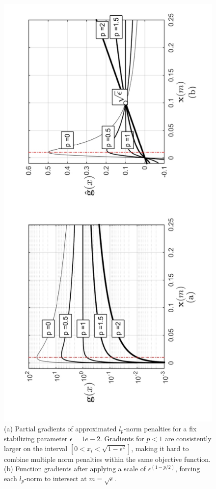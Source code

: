 \begin{figure}[h!]
\includegraphics[scale=0.58,angle=270]{Lp_g_scaled}
\caption{(a) Partial gradients of approximated $l_p$-norm penalties for a fix stabilizing parameter $\epsilon =1e-2$. Gradients for $p < 1$ are consistently larger on the interval $[0 < x_i < \sqrt{1-\epsilon^2}]$, making it hard to combine multiple norm penalties within the same objective function. (b) Function gradients after applying a scale of $\epsilon^{(1-p/2)}$, forcing each $l_p$-norm to intersect at $m = \sqrt{\epsilon}$.   }
\label{fig:Lp_g_scaled}
\end{figure}

